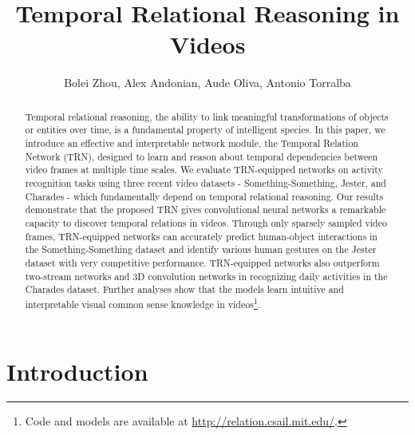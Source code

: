 \documentclass[runningheads]{llncs}
\begin{document}
\pagestyle{headings}
\mainmatter
\title{Temporal Relational Reasoning in Videos} 






\author{Bolei Zhou, Alex Andonian, Aude Oliva, Antonio Torralba}





\maketitle

\begin{abstract}
Temporal relational reasoning, the ability to link meaningful transformations of objects or entities over time, is a fundamental property of intelligent species. In this paper, we introduce an effective and interpretable network module, the Temporal Relation Network (TRN), designed to learn and reason about temporal dependencies between video frames at multiple time scales. We evaluate TRN-equipped networks on activity recognition tasks using three recent video datasets - Something-Something, Jester, and Charades - which fundamentally depend on temporal relational reasoning. Our results demonstrate that the proposed TRN gives convolutional neural networks a remarkable capacity to discover temporal relations in videos. Through only sparsely sampled video frames, TRN-equipped networks can accurately predict human-object interactions in the Something-Something dataset and identify various human gestures on the Jester dataset with very competitive performance. TRN-equipped networks also outperform two-stream networks and 3D convolution networks in recognizing daily activities in the Charades dataset. Further analyses show that the models learn intuitive and interpretable visual common sense knowledge in videos\footnote{Code and models are available at \url{http://relation.csail.mit.edu/}.}.



\end{abstract}

\section{Introduction}
\end{document}
